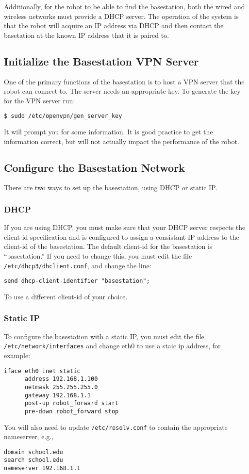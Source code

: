 Additionally, for the robot to be able to find the basestation, both
the wired and wireless networks must provide a DHCP server.  The
operation of the system is that the robot will acquire an IP address
via DHCP and then contact the basetation at the known IP address that
it is paired to.

\subsection{Initialize the Basestation VPN Server}
One of the primary functions of the basestation is to host a VPN
server that the robot can connect to.  The server needs an appropriate
key.  To generate the key for the VPN server run:

\begin{verbatim}
$ sudo /etc/openvpn/gen_server_key
\end{verbatim}

It will prompt you for some information.  It is good practice to get
the information correct, but will not actually impact the performance
of the robot.

\subsection{Configure the Basestation Network}

There are two ways to set up the basestation, using DHCP or static IP.

\subsubsection{DHCP}

If you are using DHCP, you must make sure that your DHCP server
respects the client-id specification and is configured to assign a
consistant IP address to the client-id of the basestation.  The
default client-id for the basestation is ``basestation.''  If you need
to change this, you must edit the file
\texttt{/etc/dhcp3/dhclient.conf}, and change the line:
\begin{verbatim}
send dhcp-client-identifier "basestation";
\end{verbatim}
To use a different client-id of your choice.

\subsubsection{Static IP}

To configure the basestation with a static IP, you must edit the file
\texttt{/etc/network/interfaces} and change eth0 to use a staic ip
address, for example:
\begin{verbatim}
iface eth0 inet static
      address 192.168.1.100
      netmask 255.255.255.0
      gateway 192.168.1.1
      post-up robot_forward start
      pre-down robot_forward stop
\end{verbatim}
You will also need to update \texttt{/etc/resolv.conf} to contain the
appropriate nameserver, e.g.,
\begin{verbatim}
domain school.edu
search school.edu
nameserver 192.168.1.1
\end{verbatim}

